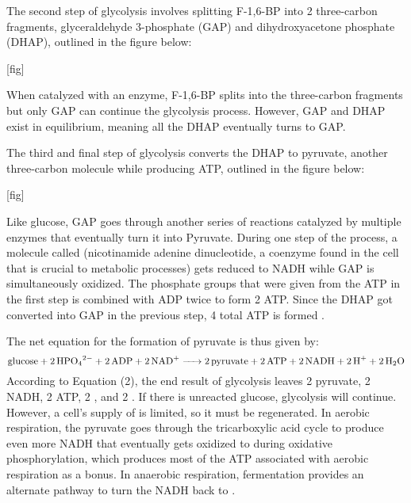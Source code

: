 \documentclass{article}
\begin{document}
\medskip

The second step of glycolysis involves splitting F-1,6-BP into 2 three-carbon fragments, glyceraldehyde 3-phosphate (GAP) and dihydroxyacetone phosphate (DHAP), outlined in the figure below:

\medskip

[fig]

\medskip

When catalyzed with an enzyme, F-1,6-BP splits into the three-carbon fragments but only GAP can continue the glycolysis process. However, GAP and DHAP exist in equilibrium, meaning all the DHAP eventually turns to GAP.

\medskip

The third and final step of glycolysis converts the DHAP to pyruvate, another three-carbon molecule while producing ATP, outlined in the figure below:

\medskip

[fig]

\medskip

Like glucose, GAP goes through another series of reactions catalyzed by multiple enzymes that eventually turn it into Pyruvate. During one step of the process, a molecule called  (nicotinamide adenine dinucleotide, a coenzyme found in the cell that is crucial to metabolic processes) \parencite{ref} gets reduced to NADH wihle GAP is simultaneously oxidized. The phosphate groups that were given from the ATP in the first step is combined with ADP twice to form 2 ATP. Since the DHAP got converted into GAP in the previous step, 4 total ATP is formed \parencite{ref}.

\medskip

The net equation for the formation of pyruvate is thus given by:
\begin{equation}
    \ce{glucose + 2HPO_{4}^{2-} + 2ADP + 2NAD+ -> 2pyruvate + 2ATP + 2 NADH + 2H+ + 2H2O}
\end{equation} %
According to Equation (2), the end result of glycolysis leaves 2 pyruvate, 2 NADH, 2 ATP, 2 , and 2 . If there is unreacted glucose, glycolysis will continue. However, a cell's supply of  is limited, so it must be regenerated. In aerobic respiration, the pyruvate goes through the tricarboxylic acid cycle to produce even more NADH that eventually gets oxidized to  during oxidative phosphorylation, which produces most of the ATP associated with aerobic respiration as a bonus. In anaerobic respiration, fermentation provides an alternate pathway to turn the NADH back to .
\end{document}
